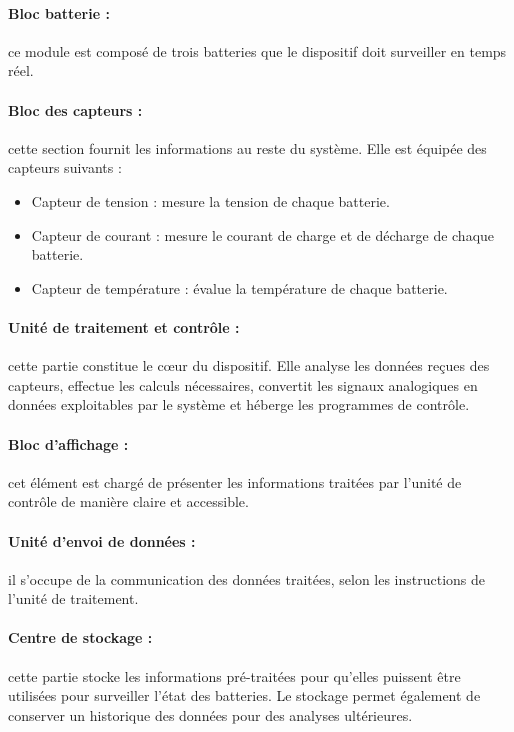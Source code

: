 \paragraph{Bloc batterie :}
ce module est composé de trois batteries que le dispositif doit surveiller en temps réel.
\paragraph{Bloc des capteurs :}
cette section fournit les informations au reste du système. Elle est équipée des capteurs suivants :
\begin{itemize}
	\item Capteur de tension : mesure la tension de chaque batterie.
	\item Capteur de courant : mesure le courant de charge et de décharge de chaque batterie.
	\item Capteur de température :  évalue la température de chaque batterie. 
\end{itemize}

\paragraph{Unité de traitement et contrôle :}
cette partie constitue le cœur du dispositif. Elle analyse les données reçues des capteurs, effectue les calculs nécessaires, convertit les signaux analogiques en données exploitables par le système et héberge les programmes de contrôle.

\paragraph{Bloc d'affichage :}
cet élément est chargé de présenter les informations traitées par l'unité de contrôle de manière claire et accessible.

\paragraph{Unité d'envoi de données :}
il s’occupe de la communication des données traitées, selon les instructions de l'unité de traitement.

\paragraph{Centre de stockage :}
cette partie stocke les informations pré-traitées pour qu'elles puissent être utilisées pour surveiller l'état des batteries. Le stockage permet également de conserver un historique des données pour des analyses ultérieures.

